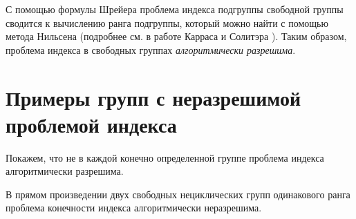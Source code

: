 \documentclass[twoside]{mfitjournal}
\begin{document}
С помощью формулы Шрейера проблема индекса подгруппы свободной группы сводится к вычислению ранга подгруппы, который можно найти с помощью метода Нильсена (подробнее см. в работе Карраса и Солитэра \cite{Kar}). Таким образом, проблема индекса в свободных группах \textit{алгоритмически разрешима}.

\section*{Примеры групп с неразрешимой проблемой индекса}

Покажем, что не в каждой конечно определенной группе проблема индекса алгоритмически разрешима. 

\begin{theorem}[1]
\label{t1}
В прямом произведении двух свободных нециклических групп одинакового  ранга проблема конечности индекса алгоритмически неразрешима.
\end{theorem}
\end{document}
